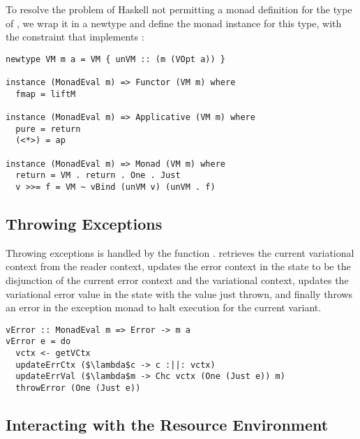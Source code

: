 \documentclass[12pt,oneside]{book}
\begin{document}
To resolve the problem of Haskell not permitting a monad definition for the type of , we wrap
it in a newtype  and define the monad instance for this type, with the constraint that  implements :

\begin{minipage}{\linewidth}
\begin{lstlisting}
newtype VM m a = VM { unVM :: (m (VOpt a)) }

instance (MonadEval m) => Functor (VM m) where
  fmap = liftM

instance (MonadEval m) => Applicative (VM m) where
  pure = return
  (<*>) = ap

instance (MonadEval m) => Monad (VM m) where
  return = VM . return . One . Just
  v >>= f = VM ~ vBind (unVM v) (unVM . f)
  \end{lstlisting}
\end{minipage}
  
\subsection{Throwing Exceptions}
\label{sec:throwing}

Throwing exceptions is handled by the function .  retrieves the current variational context
from the reader context, updates the error context in the state to be the disjunction of the current error context and the variational context,
updates the variational error value in the state with the  value just thrown, and finally throws an error in the exception monad to
halt execution for the current variant.

\begin{lstlisting}
vError :: MonadEval m => Error -> m a
vError e = do
  vctx <- getVCtx
  updateErrCtx ($\lambda$c -> c :||: vctx)
  updateErrVal ($\lambda$m -> Chc vctx (One (Just e)) m)
  throwError (One (Just e))
\end{lstlisting}

\subsection{Interacting with the Resource Environment}
\end{document}
